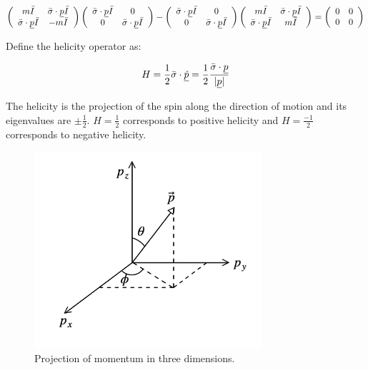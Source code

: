 \[
\left(
  \begin{array}{cc}
  m\bar{I} & \bar{\sigma}\cdot\underline{p}\bar{I} \\
  \bar{\sigma}\cdot\underline{p}\bar{I} & -m\bar{I}
  \end{array}
\right)
\left(
  \begin{array}{cc}
  \bar{\sigma}\cdot\underline{p}\bar{I} & 0 \\
  0 & \bar{\sigma}\cdot\underline{p}\bar{I}
  \end{array}
\right)
  -
  \left(
    \begin{array}{cc}
    \bar{\sigma}\cdot\underline{p}\bar{I} & 0 \\
    0 & \bar{\sigma}\cdot\underline{p}\bar{I}
    \end{array}
  \right)
  \left(
    \begin{array}{cc}
    m\bar{I} & \bar{\sigma}\cdot\underline{p}\bar{I} \\
    \bar{\sigma}\cdot\underline{p}\bar{I} & m\bar{I}
    \end{array}
  \right)
  =
  \left(
    \begin{array}{cc}
    0 & 0 \\
    0 & 0
    \end{array}
  \right)
\]

Define the helicity operator as: 

\[
  H = \frac{1}{2}\bar{\sigma}\cdot\underline{\hat{p}} = \frac{1}{2} \frac{\bar{\sigma}\cdot\underline{p}}{|\underline{p}|}
\]

The helicity is the projection of the spin along the direction of motion and its eigenvalues are $\pm \frac{1}{2}$.  $H = \frac{1}{2}$ corresponds to positive helicity and $H = \frac{-1}{2}$ corresponds to negative helicity.

\begin{figure}[!htb]
  \begin{center}
    \includegraphics[width=0.75\textwidth]{images/web_feynman/image_24.png}
    \caption[Projection of momentum in three dimensions]{Projection of momentum in three dimensions.}
    \label{fig:ch8_momentum}
  \end{center}
\end{figure}

